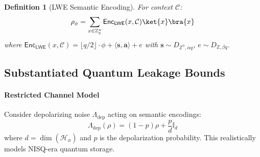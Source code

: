\documentclass[preprint,12pt]{elsarticle}
\newtheorem{definition}{Definition}[section]
\begin{document}
            \begin{definition}[LWE Semantic Encoding]\label{def:lwe_sem_encoding}
                For context $\mathcal{C}$:
                \begin{equation}\label{eq:lwe_sem_encoding}
                    \rho_\phi = \sum_{x \in \mathbb{Z}_q^n} \mathsf{Enc}_{\mathsf{LWE}}(x, \mathcal{C}) \ket{x}\bra{x}
                \end{equation}
                where $\mathsf{Enc}_{\mathsf{LWE}}(x, \mathcal{C}) = \lfloor q/2 \rfloor \cdot \phi + \langle \mathbf{s}, \mathbf{a} \rangle + e$ 
                with $\mathbf{s} \sim D_{\mathbb{Z}^n,\alpha q}$, $e \sim D_{\mathbb{Z},\beta q}$.
            \end{definition}
        
                     
        \subsection{Substantiated Quantum Leakage Bounds}\label{subsec:quantum_leakage_bounds}
            
            \paragraph{Restricted Channel Model}
            Consider depolarizing noise $\Lambda_{\text{dep}}$ acting on semantic encodings:
            \begin{equation}\label{eq:rest_chan_model}
                \Lambda_{\text{dep}}(\rho) = (1 - p)\rho + \frac{p}{d}\mathbb{I}_d
            \end{equation}
            where $d = \dim(\mathcal{H}_\phi)$ and $p$ is the depolarization probability. This realistically models NISQ-era quantum storage.
\end{document}
